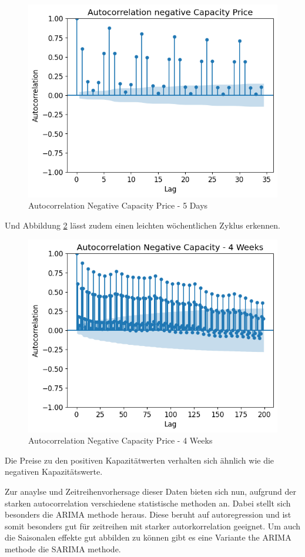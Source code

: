 \begin{figure}[!h]
	\includegraphics[width=0.7\linewidth]{pictures/Autocorrelation negative Capacity Price.png}
	\caption{Autocorrelation Negative Capacity Price - 5 Days}
	\label{fig:Autocorrelation Negative Capacity Price - 5 Days}
\end{figure}

Und Abbildung \ref{fig:AutocorrNegCap4Weeks} lässt zudem einen leichten wöchentlichen Zyklus erkennen.
\begin{figure}[!h]
	\includegraphics[width=0.7\linewidth]{pictures/Autocorrelation Negative Capacity - 4 Weeks.png}
	\caption{Autocorrelation Negative Capacity Price - 4 Weeks}
	\label{fig:AutocorrNegCap4Weeks}
\end{figure}

Die Preise zu den positiven Kapazitätwerten verhalten sich ähnlich wie die negativen Kapazitätswerte.

Zur anaylse und Zeitreihenvorhersage dieser Daten bieten sich nun, aufgrund der starken autocorrelation verschiedene statistische methoden an.
Dabei stellt sich besonders die ARIMA methode heraus. Diese beruht auf autoregression und ist somit besonders gut für zeitreihen mit starker
autorkorrelation geeignet. Um auch die Saisonalen effekte gut abbilden zu können gibt es eine Variante the ARIMA methode die SARIMA methode.

